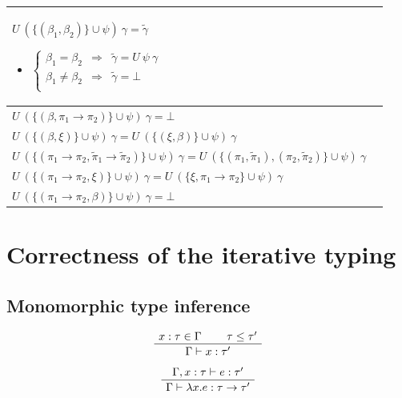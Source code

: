 \documentclass[a4paper]{report}
\newcommand{\bcell}[1]{\begin{minipage}{5cm}#1\end{minipage}}
\newcommand{\scell}[1]{\begin{minipage}{5cm}#1\end{minipage}}
\newcommand{\ax}[1]%
{\AxiomC{$#1$}}
\newcommand{\unc}[1]%
{\UnaryInfC{$#1$}}
\newcommand{\bic}[1]%
{\BinaryInfC{$#1$}}
\newcommand{\drule}%
{\DisplayProof}
\begin{document}
\begin{table}
\begin{tabular}{|l|l|}
\hline
\bcell{$U\ (\{(\beta_1,\beta_2)\}\cup\psi)\ \gamma=\tilde\gamma$
	\begin{itemize}
	\item $\left\{\begin{array}{ccl}
		\beta_1=\beta_2&\Rightarrow&\tilde\gamma=U\ \psi\ \gamma\\
		\beta_1\neq\beta_2&\Rightarrow&\tilde\gamma=\bot\\
		\end{array}\right.$
	\end{itemize}}&\scell{}\\
\hline
\bcell{$U\ (\{(\beta,\pi_1\to\pi_2)\}\cup\psi)\ \gamma=\bot$}&\scell{}\\
\hline
\bcell{$U\ (\{(\beta,\xi)\}\cup\psi)\ \gamma=U\ (\{(\xi,\beta)\}\cup\psi)\ \gamma$}&\scell{}\\
\hline
\bcell{$U\ (\{(\pi_1\to\pi_2,\tilde\pi_1\to\tilde\pi_2)\}\cup \psi)\ \gamma=U\ (\{(\pi_1,\tilde\pi_1),(\pi_2,\tilde\pi_2)\}\cup\psi)\ \gamma$}&\scell{}\\
\hline
\bcell{$U\ (\{(\pi_1\to\pi_2,\xi)\}\cup\psi)\ \gamma=U\ (\{\xi,\pi_1\to\pi_2\}\cup\psi)\ \gamma$}&\scell{}\\
\hline
\bcell{$U\ (\{(\pi_1\to\pi_2,\beta)\}\cup\psi)\ \gamma=\bot$}&\scell{}\\
\hline
\end{tabular}
\caption{}
\label{unify}
\end{table}






\chapter{Correctness of the iterative typing}

\section{Monomorphic type inference}

\begin{equation}
\ax{x:\tau	\in\Gamma}
\ax{\tau \leq \tau'}
\bic{\Gamma\vdash x:\tau'}
\drule
\end{equation}

\begin{equation}
\ax{\Gamma,x:\tau\vdash e :\tau'}
\unc{\Gamma\vdash \lambda x. e : \tau \to \tau'}
\drule
\end{equation}
\end{document}

